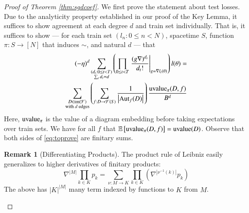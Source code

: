 \documentclass{article}
\theoremstyle{plain}
\theoremstyle{definition}
\newtheorem{rmk}{Remark}
\newcommand{\wrap}[1]{\left(#1\right)}
\newcommand{\wabs}[1]{\left|#1\right|}
\newcommand{\Free}{\mathcal{F}}
\newcommand{\Aut}{\text{\textnormal{Aut}}}
\newcommand{\image}{\text{\textnormal{im}}}
\newcommand{\uvalue}{\text{\textnormal{uvalue}}}
\newcommand{\expct}[1]{\mathbb{E}\left[#1\right]}
\begin{document}
        \begin{proof}[Proof of Theorem \ref{thm:sgdcoef}]
            We first prove the statement about test losses.
            Due to the analyticity property established in our proof of the
            Key Lemma, it suffices to show agreement at each degree $d$ and
            train set individually.  That is, it suffices to show --- for
            each train set $(l_n: 0\leq n<N)$, spacetime $S$, function $\pi:
            S\to [N]$ that induces $\sim$, and natural $d$ --- that
            \begin{align} \label{eq:toprove}
                (-\eta)^d
                \sum_{\substack{
                    (d_t: 0\leq t<T) \\
                    \sum_t d_t = d
                }}
                \wrap{
                    \prod_{0 \leq t < T} \left.
                        \frac{(g \nabla)^{d_t}}{d_t!}
                    \right|_{g=\nabla l_t(\theta)}
                } l (\theta)
                = \nonumber \\
                \sum_{\substack{
                    D \in \image(\Free) \\
                    \textnormal{with $d$ edges}
                }}
                \wrap{
                    \sum_{f: D\to\Free(S)}
                    \frac{1}{\wabs{\Aut_f(D)}}
                }
                \frac{\uvalue_\pi(D, f)}{B^{d}}
            \end{align}
            Here, $\uvalue_\pi$ is the value of a diagram embedding before
            taking expectations over train sets.  We have for all $f$ that
            $\expct{\uvalue_\pi(D, f)} = \uvalue(D)$.
            Observe that both sides of \ref{eq:toprove} are finitary sums.

            \begin{rmk}[Differentiating Products] \label{rmk:leibniz}
                The product rule of Leibniz easily generalizes to higher
                derivatives of finitary products:
                $$
                    \nabla^{\wabs{M}} \prod_{k \in K} p_k
                    = 
                    \sum_{\nu:M\to K} \prod_{k\in K} \wrap{
                        \nabla^{\wabs{\nu^{-1}(k)}} p_k
                    }
                $$
                The above has $\wabs{K}^{\wabs{M}}$ many term indexed by
                functions to $K$ from $M$.
            \end{rmk}


\end{proof}
\end{document}
